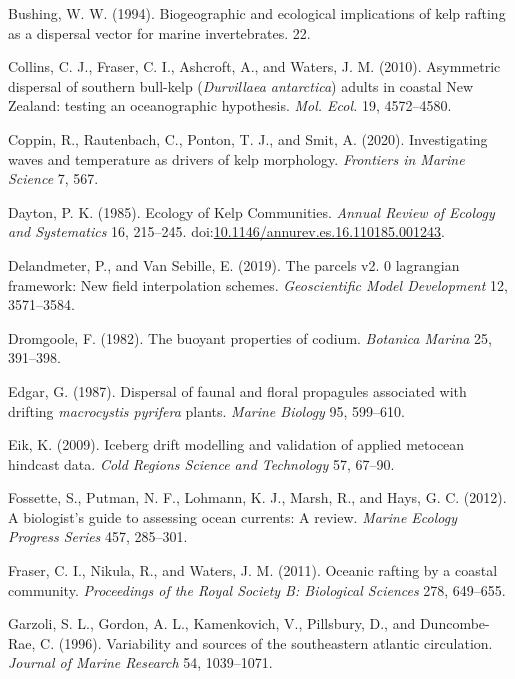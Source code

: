 \documentclass[
]{article}
\begin{document}
\leavevmode\hypertarget{ref-bushing1994}{}%
Bushing, W. W. (1994). Biogeographic and ecological implications of kelp
rafting as a dispersal vector for marine invertebrates. 22.

\leavevmode\hypertarget{ref-collins2010}{}%
Collins, C. J., Fraser, C. I., Ashcroft, A., and Waters, J. M. (2010).
Asymmetric dispersal of southern bull-kelp (\emph{Durvillaea
antarctica}) adults in coastal New Zealand: testing an oceanographic
hypothesis. \emph{Mol. Ecol.} 19, 4572--4580.

\leavevmode\hypertarget{ref-coppin2020}{}%
Coppin, R., Rautenbach, C., Ponton, T. J., and Smit, A. (2020).
Investigating waves and temperature as drivers of kelp morphology.
\emph{Frontiers in Marine Science} 7, 567.

\leavevmode\hypertarget{ref-dayton1985}{}%
Dayton, P. K. (1985). Ecology of Kelp Communities. \emph{Annual Review
of Ecology and Systematics} 16, 215--245.
doi:\href{https://doi.org/10.1146/annurev.es.16.110185.001243}{10.1146/annurev.es.16.110185.001243}.

\leavevmode\hypertarget{ref-delandmeter2019}{}%
Delandmeter, P., and Van Sebille, E. (2019). The parcels v2. 0
lagrangian framework: New field interpolation schemes.
\emph{Geoscientific Model Development} 12, 3571--3584.

\leavevmode\hypertarget{ref-dromgoole1982}{}%
Dromgoole, F. (1982). The buoyant properties of codium. \emph{Botanica
Marina} 25, 391--398.

\leavevmode\hypertarget{ref-edgar1987}{}%
Edgar, G. (1987). Dispersal of faunal and floral propagules associated
with drifting \emph{macrocystis pyrifera} plants. \emph{Marine Biology}
95, 599--610.

\leavevmode\hypertarget{ref-eik2009}{}%
Eik, K. (2009). Iceberg drift modelling and validation of applied
metocean hindcast data. \emph{Cold Regions Science and Technology} 57,
67--90.

\leavevmode\hypertarget{ref-fossette2012}{}%
Fossette, S., Putman, N. F., Lohmann, K. J., Marsh, R., and Hays, G. C.
(2012). A biologist's guide to assessing ocean currents: A review.
\emph{Marine Ecology Progress Series} 457, 285--301.

\leavevmode\hypertarget{ref-fraser2011}{}%
Fraser, C. I., Nikula, R., and Waters, J. M. (2011). Oceanic rafting by
a coastal community. \emph{Proceedings of the Royal Society B:
Biological Sciences} 278, 649--655.

\leavevmode\hypertarget{ref-garzoli1996}{}%
Garzoli, S. L., Gordon, A. L., Kamenkovich, V., Pillsbury, D., and
Duncombe-Rae, C. (1996). Variability and sources of the southeastern
atlantic circulation. \emph{Journal of Marine Research} 54, 1039--1071.
\end{document}
